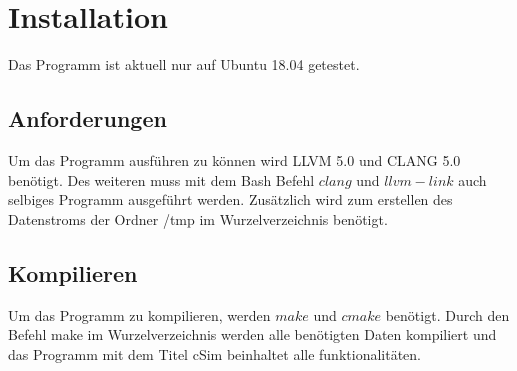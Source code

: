 \documentclass{scrreprt}
\begin{document}
\chapter{Installation}

Das Programm ist aktuell nur auf Ubuntu 18.04 getestet.

\section{Anforderungen}

Um das Programm ausführen zu können wird LLVM 5.0 und CLANG 5.0 benötigt. Des weiteren muss mit dem Bash Befehl \(clang\) und \(llvm-link\) auch selbiges Programm ausgeführt werden.
Zusätzlich wird zum erstellen des Datenstroms der Ordner /tmp im Wurzelverzeichnis benötigt.

\section{Kompilieren}

Um das Programm zu kompilieren, werden \(make\) und \(cmake\) benötigt. Durch den Befehl make im Wurzelverzeichnis werden alle benötigten Daten kompiliert und das Programm mit dem Titel cSim beinhaltet alle funktionalitäten.
\end{document}
